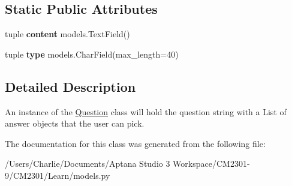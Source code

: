 \subsection*{Static Public Attributes}
\begin{DoxyCompactItemize}
\item 
\hypertarget{class_learn_1_1models_1_1_question_ad11386e06fa22f48129ec588d6caa491}{tuple {\bfseries content} models.\-Text\-Field()}\label{class_learn_1_1models_1_1_question_ad11386e06fa22f48129ec588d6caa491}

\item 
\hypertarget{class_learn_1_1models_1_1_question_aed186eae128695191043fc31e012b07e}{tuple {\bfseries type} models.\-Char\-Field(max\-\_\-length=40)}\label{class_learn_1_1models_1_1_question_aed186eae128695191043fc31e012b07e}

\end{DoxyCompactItemize}


\subsection{Detailed Description}
An instance of the \hyperlink{class_learn_1_1models_1_1_question}{Question} class will hold the question string with a List of answer objects that the user can pick. 

The documentation for this class was generated from the following file\-:\begin{DoxyCompactItemize}
\item 
/\-Users/\-Charlie/\-Documents/\-Aptana Studio 3 Workspace/\-C\-M2301-\/9/\-C\-M2301/\-Learn/models.\-py\end{DoxyCompactItemize}
